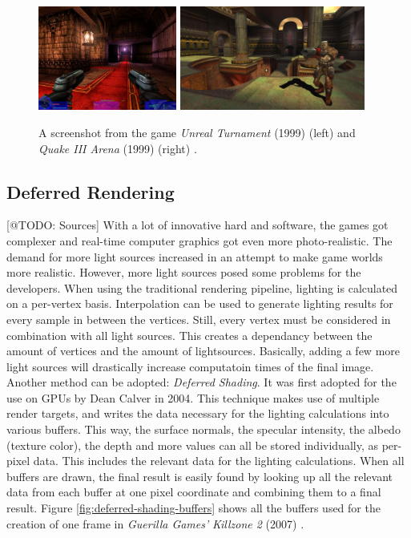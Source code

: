 \begin{figure}[h]
    \centering
    \includegraphics[width=172.5px]{images/graphics/unreal-turnament.jpg}
    \includegraphics[width=230px]{images/graphics/quake-iii-arena.jpg}
    \caption{A screenshot from the game \emph{Unreal Turnament} (1999) (left) and \emph{Quake III Arena} (1999) 
    (right) \cite{GamespotUnrealTurnament, GameWatcher2006}.}
    \label{fig:unreal-turnament-quake-arena}
\end{figure}


\subsection*{Deferred Rendering} \label{subsec-deferred-rendering}

[@TODO: Sources]
With a lot of innovative hard and software, the games got complexer and real-time computer graphics got even more 
photo-realistic. The demand for more light sources increased in an attempt to make game worlds more realistic. 
However, more light sources posed some problems for the developers. When using the traditional rendering pipeline,
lighting is calculated on a per-vertex basis. Interpolation can be used to generate lighting results for every sample 
in between the vertices. Still, every vertex must be considered in combination with all light sources. This creates a 
dependancy between the amount of vertices and the amount of lightsources. Basically, adding a few more light sources 
will drastically increase computatoin times of the final image. Another method can be adopted: \emph{Deferred Shading}.
It was first adopted for the use on \ac{GPU}s by Dean Calver \cite{Calver2004} in 2004. This technique makes use of 
multiple render targets, and writes the data necessary for the lighting calculations into various buffers. This way, 
the surface normals, the specular intensity, the albedo (texture color), the depth and more values can all be stored 
individually, as per-pixel data. This includes the relevant data for the lighting calculations. When all buffers are 
drawn, the final result is easily found by looking up all the relevant data from each buffer at one pixel coordinate 
and combining them to a final result. Figure \ref{fig:deferred-shading-buffers} shows all the buffers used for the 
creation of one frame in \emph{Guerilla Games'} \emph{Killzone 2} (2007) \cite{KillzoneFandom}. 

